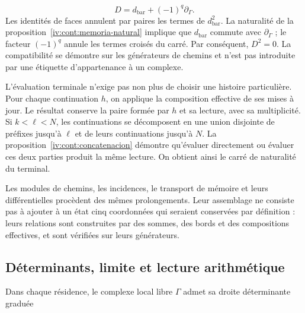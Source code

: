 \[
D=d_{\mathrm{bar}}+(-1)^q\partial_\Gamma.
\]
Les identités de faces annulent par paires les termes de \(d_{\mathrm{bar}}^2\). La naturalité de la proposition~\ref{iv:cont:memoria-natural} implique que \(d_{\mathrm{bar}}\) commute avec \(\partial_\Gamma\) ; le facteur \((-1)^q\) annule les termes croisés du carré. Par conséquent, \(D^2=0\). La compatibilité se démontre sur les générateurs de chemins et n'est pas introduite par une étiquette d'appartenance à un complexe.

L'évaluation terminale n'exige pas non plus de choisir une histoire particulière. Pour chaque continuation \(h\), on applique la composition effective de ses mises à jour. Le résultat conserve la paire formée par \(h\) et sa lecture, avec sa multiplicité. Si \(k<\ell<N\), les continuations se décomposent en une union disjointe de préfixes jusqu'à \(\ell\) et de leurs continuations jusqu'à \(N\). La proposition~\ref{iv:cont:concatenacion} démontre qu'évaluer directement ou évaluer ces deux parties produit la même lecture. On obtient ainsi le carré de naturalité du terminal.

Les modules de chemins, les incidences, le transport de mémoire et leurs différentielles procèdent des mêmes prolongements. Leur assemblage ne consiste pas à ajouter à un état cinq coordonnées qui seraient conservées par définition : leurs relations sont construites par des sommes, des bords et des compositions effectives, et sont vérifiées sur leurs générateurs.

\subsection{Déterminants, limite et lecture arithmétique}
\label{iv:cont:determinantes}
Dans chaque résidence, le complexe local libre \(\Gamma\) admet sa droite déterminante graduée

